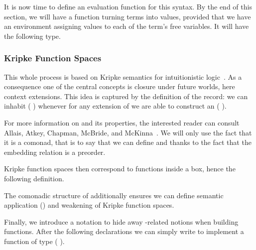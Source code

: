 \documentclass{article}
\begin{document}
It is now time to define an evaluation function for this syntax.
By the end of this section, we will have a function 
turning terms into values,
provided that we have an environment assigning values
to each of the term's free variables. It will have the following type.


\subsubsection{Kripke Function Spaces}

This whole process is based on Kripke semantics for intuitionistic
logic~\cite{DBLP:journals/apal/MitchellM91}.
As a consequence one of the central concepts is closure under future
worlds, here context extensions.
This idea is captured by the definition of the  record: we
can inhabit (  ) whenever for any extension
 of  we are able to construct an ( ).


For more information on  and its properties, the interested
reader can consult Allais, Atkey, Chapman, McBride, and
McKinna~\cite[Section~3.1]{DBLP:journals/jfp/AllaisACMM21}.
%
We will only use the fact that it is a comonad, that is to say that
we can define  and  thanks to
the fact that the embedding relation is a preorder.


Kripke function spaces then correspond to functions inside a box,
hence the following definition.


The comonadic structure of  additionally ensures we can define
semantic application (\AF{\_\$\$\_}) and weakening of Kripke function
spaces.

\noindent
\begin{minipage}{0.45\textwidth}
\end{minipage}\hfill
\begin{minipage}{0.5\textwidth}
\end{minipage}

Finally, we introduce a notation to hide away -related
notions when building  functions.
%
After the following declarations we can simply write
 to implement a function of type
(   ).
\end{document}
